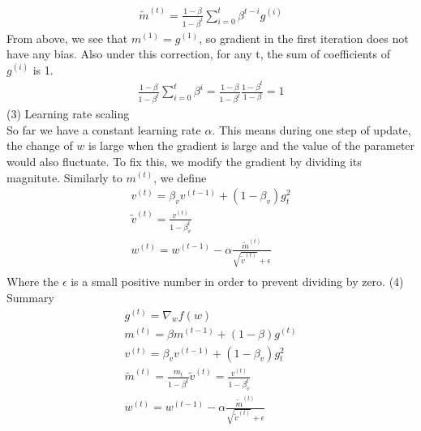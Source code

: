 \documentclass[a4paper]{article}
\begin{document}
\begin{align*}
	\tilde	m^{(t)} = \frac{1 - \beta}{1 - \beta^t} \sum_{i=0}^t \beta^{t-i}g^{(i)}
\end{align*}
From above, we see that $m^{(1)} = g^{(1)}$, so gradient in the first iteration does not have any bias. Also under this correction, for any t, the sum of coefficients of $g^{(i)}$ is 1.
\begin{align*}
	\frac{1 - \beta}{1 - \beta^t} \sum_{i=0}^t \beta^{i} = \frac{1 - \beta}{1 - \beta^t}\frac{1 - \beta^t}{1 - \beta} = 1
\end{align*}
(3) Learning rate scaling\\
So far we have a constant learning rate $\alpha$. This means during one step of update, the change of $w$ is large when the gradient is large and the value of the parameter would also fluctuate. To fix this, we modify the gradient by dividing its magnitute. Similarly to $m^{(t)}$, we define
\begin{align*}
	v^{(t)} = \beta_v v^{(t-1)} + (1 - \beta_v) g^2_t\\
	\tilde v^{(t)} =  \frac{v^{(t)}}{1 - \beta_v^t}\\
	w^{(t)} = w^{(t-1)} - \alpha \frac{\tilde m^{(t)}}{\sqrt{\tilde v^{(t)}} + \epsilon} \\
\end{align*}
Where the $\epsilon$ is a small positive number in order to prevent dividing by zero.
(4) Summary 
\begin{align*}
	g^{(t)} = \nabla_w f(w)\\
 	m^{(t)} = \beta m^{(t-1)} + (1 - \beta)g^{(t)} \\
	v^{(t)} = \beta_v v^{(t-1)} + (1 - \beta_v) g^2_t\\
	 \tilde m^{(t)} = \frac{m_t}{1 - \beta^t} 
	 \tilde v^{(t)} =  \frac{v^{(t)}}{1 - \beta_v^t}\\
	 w^{(t)} = w^{(t-1)} - \alpha \frac{\tilde m^{(t)}}{\sqrt{\tilde v^{(t)}} + \epsilon} \\
\end{align*}
\end{document}
